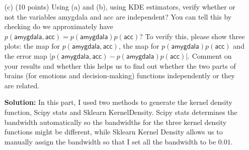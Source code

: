 \documentclass[twoside,12pt]{article}
\begin{document}
\begin{enumerate}
 \item[(c)] (10 points) Using (a) and (b), using KDE estimators, verify whether or not  the variables \textsf{amygdala} and \textsf{acc} are independent? You can tell this by checking do we approximately have $p( \textsf{amygdala},  \textsf{acc}) = p( \textsf{amygdala}) p(\textsf{acc})$? To verify this, please show three plots: the map for $p( \textsf{amygdala},  \textsf{acc})$, the map for $p( \textsf{amygdala}) p(\textsf{acc})$ and the error map $|p( \textsf{amygdala},  \textsf{acc}) - p( \textsf{amygdala}) p(\textsf{acc})|$. Comment on your results and whether this helps us to find out whether the two parts of brains (for emotions and decision-making) functions independently or they are related. 
\begin{tcolorbox}
 \textbf{Solution:} In this part, I used two methods to generate the kernel density function, Scipy stats and Sklearn KernelDensity. Scipy stats determines the bandwidth automatically so the bandwidths for the three kernel density functions might be different, while Sklearn Kernel Density allows us to manually assign the bandwidth so that I set all the bandwidth to be $0.01$.\\
 

\end{tcolorbox}
\end{enumerate}
\end{document}
